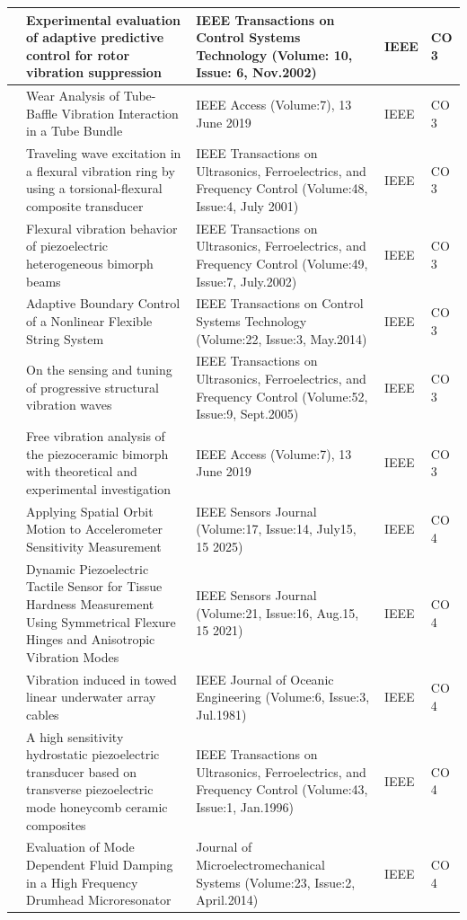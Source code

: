 \documentclass[11pt,paper=a4,answers]{exam}
\begin{document}
\begin{flushleft}
\begin{longtable}{|>{\centering\arraybackslash}p{1.4cm}  |  >{\raggedright\arraybackslash}p{6cm} |>{\centering\arraybackslash}p{3.75cm}|>{\centering\arraybackslash}p{2cm} |>{\centering\arraybackslash}p{2cm} |}
122&Experimental evaluation of adaptive predictive control for rotor vibration suppression&IEEE Transactions on Control Systems Technology (Volume: 10, Issue: 6, Nov.2002)&IEEE&CO 3\\\hline
123&Wear Analysis of Tube-Baffle Vibration Interaction in a Tube Bundle&IEEE Access (Volume:7), 13 June 2019&IEEE&CO 3\\\hline
124&Traveling wave excitation in a flexural vibration ring by using a torsional-flexural composite transducer&IEEE Transactions on Ultrasonics, Ferroelectrics, and Frequency Control (Volume:48, Issue:4, July 2001)&IEEE&CO 3\\\hline
125&Flexural vibration behavior of piezoelectric heterogeneous bimorph beams&IEEE Transactions on Ultrasonics, Ferroelectrics, and Frequency Control (Volume:49, Issue:7, July.2002)&IEEE&CO 3\\\hline
126&Adaptive Boundary Control of a Nonlinear Flexible String System&IEEE Transactions on Control Systems Technology (Volume:22, Issue:3, May.2014)&IEEE&CO 3\\\hline
127&On the sensing and tuning of progressive structural vibration waves&IEEE Transactions on Ultrasonics, Ferroelectrics, and Frequency Control (Volume:52, Issue:9, Sept.2005)&IEEE&CO 3\\\hline
128&Free vibration analysis of the piezoceramic bimorph with theoretical and experimental investigation&IEEE Access (Volume:7), 13 June 2019&IEEE&CO 3\\\hline
129&Applying Spatial Orbit Motion to Accelerometer Sensitivity Measurement&IEEE Sensors Journal (Volume:17, Issue:14, July15, 15 2025)&IEEE&CO 4\\\hline
130&Dynamic Piezoelectric Tactile Sensor for Tissue Hardness Measurement Using Symmetrical Flexure Hinges and Anisotropic Vibration Modes&IEEE Sensors Journal (Volume:21, Issue:16, Aug.15, 15 2021)&IEEE&CO 4\\\hline
131&Vibration induced in towed linear underwater array cables&IEEE Journal of Oceanic Engineering (Volume:6, Issue:3, Jul.1981)&IEEE&CO 4\\\hline
132&A high sensitivity hydrostatic piezoelectric transducer based on transverse piezoelectric mode honeycomb ceramic composites&IEEE Transactions on Ultrasonics, Ferroelectrics, and Frequency Control (Volume:43, Issue:1, Jan.1996)&IEEE&CO 4\\\hline
133&Evaluation of Mode Dependent Fluid Damping in a High Frequency Drumhead Microresonator&Journal of Microelectromechanical Systems (Volume:23, Issue:2, April.2014)&IEEE&CO 4\\\hline

\end{longtable}
\end{flushleft}
\end{document}

